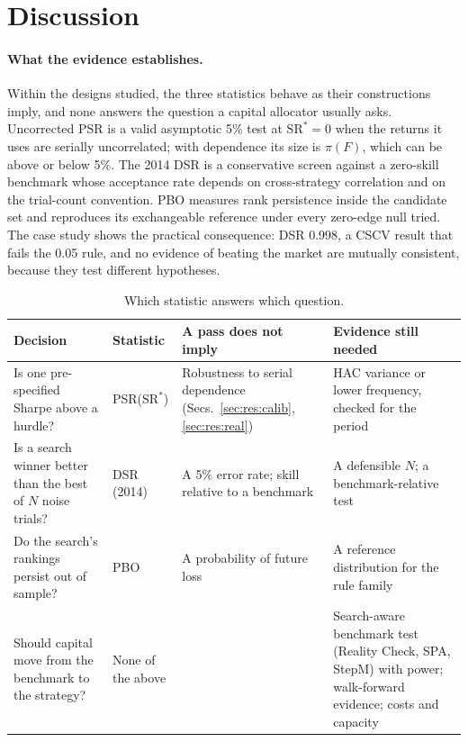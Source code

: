 \documentclass[11pt,a4paper]{article}
\newcommand{\SR}{\mathrm{SR}}
\theoremstyle{remark}
\begin{document}
\section{Discussion}\label{sec:discussion}

\paragraph{What the evidence establishes.} Within the designs studied, the three statistics behave as their constructions imply, and none answers the question a capital allocator usually asks. Uncorrected PSR is a valid asymptotic 5\% test at $\SR^\ast=0$ when the returns it uses are serially uncorrelated; with dependence its size is $\pi(F)$, which can be above or below 5\%. The 2014 DSR is a conservative screen against a zero-skill benchmark whose acceptance rate depends on cross-strategy correlation and on the trial-count convention. PBO measures rank persistence inside the candidate set and reproduces its exchangeable reference under every zero-edge null tried. The case study shows the practical consequence: DSR 0.998, a CSCV result that fails the 0.05 rule, and no evidence of beating the market are mutually consistent, because they test different hypotheses.

\begin{table}[t]
\centering\small
\caption{Which statistic answers which question.}\label{tab:decision}
\begin{tabularx}{\textwidth}{@{}>{\raggedright\arraybackslash}p{3.4cm}>{\raggedright\arraybackslash}p{2.6cm}>{\raggedright\arraybackslash}X>{\raggedright\arraybackslash}X@{}}
\toprule
Decision & Statistic & A pass does not imply & Evidence still needed \\
\midrule
Is one pre-specified Sharpe above a hurdle? & PSR($\SR^\ast$) & Robustness to serial dependence (Secs.~\ref{sec:res:calib}, \ref{sec:res:real}) & HAC variance or lower frequency, checked for the period \\
Is a search winner better than the best of $N$ noise trials? & DSR (2014) & A 5\% error rate; skill relative to a benchmark & A defensible $N$; a benchmark-relative test \\
Do the search's rankings persist out of sample? & PBO & A probability of future loss & A reference distribution for the rule family \\
Should capital move from the benchmark to the strategy? & None of the above & & Search-aware benchmark test (Reality Check, SPA, StepM) with power; walk-forward evidence; costs and capacity \\
\bottomrule
\end{tabularx}
\end{table}
\end{document}
